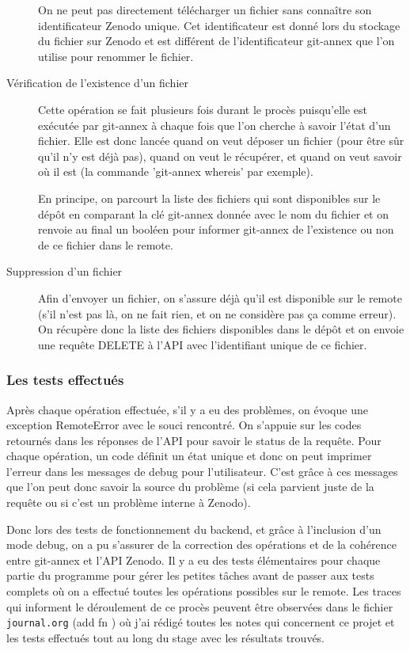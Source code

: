 \documentclass[11pt]{article}
\begin{document}
\begin{description}
On ne peut pas directement télécharger un fichier sans connaître son
identificateur Zenodo unique. Cet identificateur est donné lors du
stockage du fichier sur Zenodo et est différent de l'identificateur
git-annex que l'on utilise pour renommer le fichier.

\item[{Vérification de l'existence d'un fichier}] Cette opération se fait plusieurs fois durant le procès puisqu'elle
est exécutée par git-annex à chaque fois que l'on cherche à savoir
l'état d'un fichier. Elle est donc lancée quand on
veut déposer un fichier (pour être sûr qu'il n'y est déjà pas),
quand on veut le récupérer, et quand on veut savoir où il est (la
commande 'git-annex whereis' par exemple).

En principe, on parcourt la liste des fichiers qui sont disponibles
sur le dépôt en comparant la clé git-annex donnée avec le nom du
fichier et on renvoie au final un booléen pour informer git-annex
de l'existence ou non de ce fichier dans le remote.

\item[{Suppression d'un fichier}] Afin d'envoyer un fichier, on s'assure déjà qu'il est disponible sur
le remote (s'il n'est pas là, on ne fait rien, et on ne considère
pas ça comme erreur). On récupère donc la liste des fichiers
disponibles dans le dépôt et on envoie une requête DELETE à l'API
avec l'identifiant unique de ce fichier.
\end{description}

\subsubsection{Les tests effectués}
\label{sec:org9e17c43}
Après chaque opération effectuée, s'il y a eu des problèmes, on évoque
une exception RemoteError avec le souci rencontré. On s'appuie sur
les codes retournés dans les réponses de l'API pour savoir le status
de la requête. Pour chaque opération, un code définit un état unique
et donc on peut imprimer l'erreur dans les messages de debug pour
l'utilisateur. C'est grâce à ces messages que l'on peut donc savoir
la source du problème (si cela parvient juste de la requête ou si
c'est un problème interne à Zenodo).

Donc lors des tests de fonctionnement du backend, et grâce à
l'inclusion d'un mode debug, on a pu s'assurer de la correction des
opérations et de la cohérence entre git-annex et l'API Zenodo.
Il y a eu des tests élémentaires pour chaque partie du programme
pour gérer les petites tâches avant de passer aux tests complets où
on a effectué toutes les opérations possibles sur le remote.
Les traces qui informent le déroulement de ce procès peuvent être
observées dans le fichier \texttt{journal.org}  (add fn ) où j'ai rédigé toutes les
notes qui concernent ce projet et les tests effectués tout au long
du stage avec les résultats trouvés.
\end{document}
